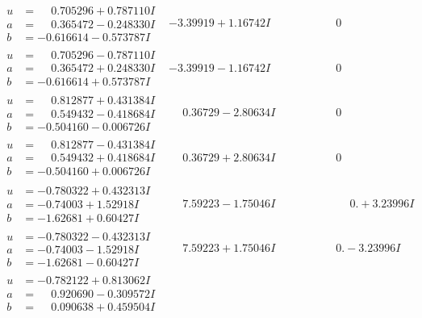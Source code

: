 \documentclass[1p]{elsarticle_modified}
\theoremstyle{definition}
\begin{document}
$$\begin{array}{c|c|c}
\begin{aligned}
u &= \phantom{-}0.705296 + 0.787110 I \\
a &= \phantom{-}0.365472 - 0.248330 I \\
b &= -0.616614 - 0.573787 I\end{aligned}
 & -3.39919 + 1.16742 I & \phantom{-0.000000 } 0 \\ \hline\begin{aligned}
u &= \phantom{-}0.705296 - 0.787110 I \\
a &= \phantom{-}0.365472 + 0.248330 I \\
b &= -0.616614 + 0.573787 I\end{aligned}
 & -3.39919 - 1.16742 I & \phantom{-0.000000 } 0 \\ \hline\begin{aligned}
u &= \phantom{-}0.812877 + 0.431384 I \\
a &= \phantom{-}0.549432 - 0.418684 I \\
b &= -0.504160 - 0.006726 I\end{aligned}
 & \phantom{-}0.36729 - 2.80634 I & \phantom{-0.000000 } 0 \\ \hline\begin{aligned}
u &= \phantom{-}0.812877 - 0.431384 I \\
a &= \phantom{-}0.549432 + 0.418684 I \\
b &= -0.504160 + 0.006726 I\end{aligned}
 & \phantom{-}0.36729 + 2.80634 I & \phantom{-0.000000 } 0 \\ \hline\begin{aligned}
u &= -0.780322 + 0.432313 I \\
a &= -0.74003 + 1.52918 I \\
b &= -1.62681 + 0.60427 I\end{aligned}
 & \phantom{-}7.59223 - 1.75046 I & \phantom{-0.000000 -}0. + 3.23996 I \\ \hline\begin{aligned}
u &= -0.780322 - 0.432313 I \\
a &= -0.74003 - 1.52918 I \\
b &= -1.62681 - 0.60427 I\end{aligned}
 & \phantom{-}7.59223 + 1.75046 I & \phantom{-0.000000 } 0. - 3.23996 I \\ \hline\begin{aligned}
u &= -0.782122 + 0.813062 I \\
a &= \phantom{-}0.920690 - 0.309572 I \\
b &= \phantom{-}0.090638 + 0.459504 I\end{aligned}

\end{array}$$
\end{document}
